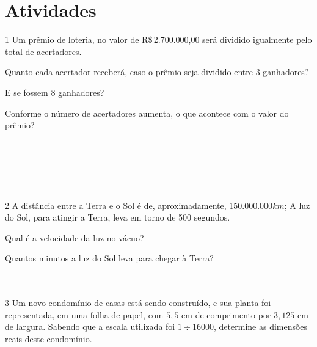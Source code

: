 \section{Atividades}




\num{1} Um prêmio de loteria, no valor de R\$\,2.700.000,00 será dividido
igualmente pelo total de acertadores.

\begin{escolha}[itemsep=0pt]
\item Quanto cada acertador receberá, caso o prêmio seja dividido entre 3 ganhadores?
\item E se fossem 8 ganhadores?
\item Conforme o número de acertadores aumenta, o que acontece com o valor do prêmio?
\end{escolha}

\\
 \\
\\
\\
\\



\num{2} A distância entre a Terra e o Sol é de, aproximadamente, $150.000.000 km$; 
A luz do Sol, para atingir a Terra, leva em torno de 500 segundos.

\begin{escolha}[itemsep=0pt]
\item Qual é a velocidade da luz no vácuo?
\item Quantos minutos a luz do Sol leva para chegar à Terra?
\end{escolha}

    \\
    \\






\num{3} Um novo condomínio de casas está sendo construído, e sua planta foi
representada, em uma folha de papel, com $5,5$ cm de comprimento por $3,125$
cm de largura. Sabendo que a escala utilizada foi $1 \div 16 000$, determine
as dimensões reais deste condomínio.

